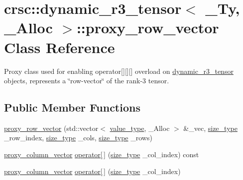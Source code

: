 \hypertarget{classcrsc_1_1dynamic__r3__tensor_1_1proxy__row__vector}{}\section{crsc\+:\+:dynamic\+\_\+r3\+\_\+tensor$<$ \+\_\+\+Ty, \+\_\+\+Alloc $>$\+:\+:proxy\+\_\+row\+\_\+vector Class Reference}
\label{classcrsc_1_1dynamic__r3__tensor_1_1proxy__row__vector}


Proxy class used for enabling operator\mbox{[}\mbox{]}\mbox{[}\mbox{]}\mbox{[}\mbox{]} overload on \hyperlink{classcrsc_1_1dynamic__r3__tensor}{dynamic\+\_\+r3\+\_\+tensor} objects, represents a \char`\"{}row-\/vector\char`\"{} of the rank-\/3 tensor.  


\subsection*{Public Member Functions}
\begin{DoxyCompactItemize}
\item 
\hyperlink{classcrsc_1_1dynamic__r3__tensor_1_1proxy__row__vector_a68142064e5a0f88d9c8bee9aaa8930d4}{proxy\+\_\+row\+\_\+vector} (std\+::vector$<$ \hyperlink{classcrsc_1_1dynamic__r3__tensor_ad7fb44388c819fb7947771da18bb625b}{value\+\_\+type}, \+\_\+\+Alloc $>$ \&\+\_\+vec, \hyperlink{classcrsc_1_1dynamic__r3__tensor_a00e5f1f46f16d0c0ac1cffa6bd0fe862}{size\+\_\+type} \+\_\+row\+\_\+index, \hyperlink{classcrsc_1_1dynamic__r3__tensor_a00e5f1f46f16d0c0ac1cffa6bd0fe862}{size\+\_\+type} \+\_\+cols, \hyperlink{classcrsc_1_1dynamic__r3__tensor_a00e5f1f46f16d0c0ac1cffa6bd0fe862}{size\+\_\+type} \+\_\+rows)
\item 
\hyperlink{classcrsc_1_1dynamic__r3__tensor_1_1proxy__column__vector}{proxy\+\_\+column\+\_\+vector} \hyperlink{classcrsc_1_1dynamic__r3__tensor_1_1proxy__row__vector_a978304ca47bdaa4f6f97131c033ae676}{operator\mbox{[}$\,$\mbox{]}} (\hyperlink{classcrsc_1_1dynamic__r3__tensor_a00e5f1f46f16d0c0ac1cffa6bd0fe862}{size\+\_\+type} \+\_\+col\+\_\+index) const 
\item 
\hyperlink{classcrsc_1_1dynamic__r3__tensor_1_1proxy__column__vector}{proxy\+\_\+column\+\_\+vector} \hyperlink{classcrsc_1_1dynamic__r3__tensor_1_1proxy__row__vector_a7345a4b2bc9c8f3c0fc736e64cf8902e}{operator\mbox{[}$\,$\mbox{]}} (\hyperlink{classcrsc_1_1dynamic__r3__tensor_a00e5f1f46f16d0c0ac1cffa6bd0fe862}{size\+\_\+type} \+\_\+col\+\_\+index)
\end{DoxyCompactItemize}
